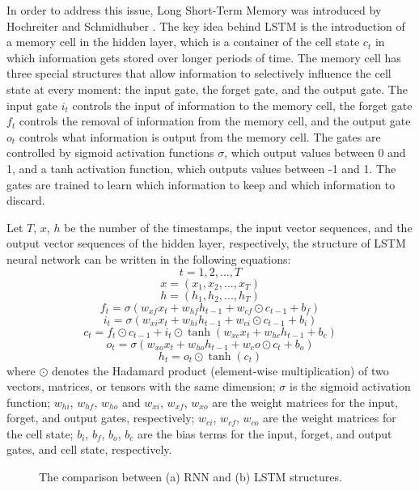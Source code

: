 \documentclass[11pt]{uonthesis}
\begin{document}
In order to address this issue, Long Short-Term Memory was introduced by Hochreiter and Schmidhuber \cite{lstm}. The key idea behind LSTM is the introduction of a memory cell in the hidden layer, which is a container of the cell state $c_t$ in which information gets stored over longer periods of time. The memory cell has three special structures that allow information to selectively influence the cell state at every moment: the input gate, the forget gate, and the output gate. The input gate $i_t$ controls the input of information to the memory cell, the forget gate $f_t$ controls the removal of information from the memory cell, and the output gate $o_t$ controls what information is output from the memory cell. The gates are controlled by sigmoid activation functions $\sigma$, which output values between 0 and 1, and a tanh activation function, which outputs values between -1 and 1. The gates are trained to learn which information to keep and which information to discard.

Let $T$, $x$, $h$ be the number of the timestamps, the input vector sequences, and the output vector sequences of the hidden layer, respectively, the structure of LSTM neural network can be written in the following equations:
\[t = 1, 2, ..., T\]
\[x = (x_{1}, x_{2},..., x_T)\]
\[h = (h_{1}, h_{2},..., h_T)\]
\[f_t = \sigma(w_{xf} x_t + w_{hf} h_{t-1} + w_{cf} \odot c_{t-1} + b_f )\]
\[i_t = \sigma(w_{xi} x_t + w_{hi} h_{t-1} + w_{ci} \odot c_{t-1} + b_i )\]
\[c_t = f_t \odot c_{t-1} + i_t \odot \tanh(w_{xc} x_t + w_{hc} h_{t-1} + b_c)\] 
\[o_t = \sigma(w_{xo} x_t + w_{ho} h_{t-1} + w_co \odot c_t + b_o)\]
\[h_t = o_t \odot \tanh(c_t)\]
where
$\odot$ denotes the Hadamard product (element-wise multiplication) of two vectors, matrices, or tensors with the same dimension;
$\sigma$ is the sigmoid activation function;
$w_{hi}$, $w_{hf}$, $w_{ho}$ and $w_{xi}$, $w_{xf}$, $w_{xo}$ are the weight matrices for the input, forget, and output gates, respectively;
$w_{ci}$, $w_{cf}$, $w_{co}$ are the weight matrices for the cell state;
$b_i$, $b_f$, $b_o$, $b_c$ are the bias terms for the input, forget, and output gates, and cell state, respectively.


\begin{figure}[ht!]
    \centering
\caption{The comparison between (a) RNN and (b) LSTM structures.}
\label{bb}
\end{figure}
\end{document}
